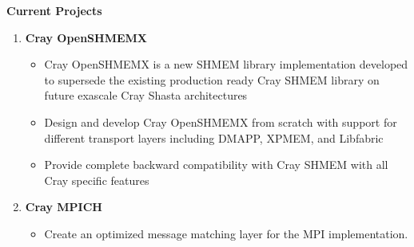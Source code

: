 \textbf{Current Projects}
\begin{enumerate}
\setcounter{enumi}{0}
\item \textbf{Cray OpenSHMEMX}
    \begin{itemize}
        \item Cray OpenSHMEMX is a new SHMEM library implementation developed to
        supersede the existing production ready Cray SHMEM library on future
        exascale Cray Shasta architectures
        \item Design and develop Cray OpenSHMEMX from scratch with support for
        different transport layers including DMAPP, XPMEM, and Libfabric
        \item Provide complete backward compatibility with Cray SHMEM with all
        Cray specific features
    \end{itemize}

\item \textbf{Cray MPICH}
    \begin{itemize}
        \item Create an optimized message matching layer for the MPI
        implementation.
    \end{itemize}
\end{enumerate}

